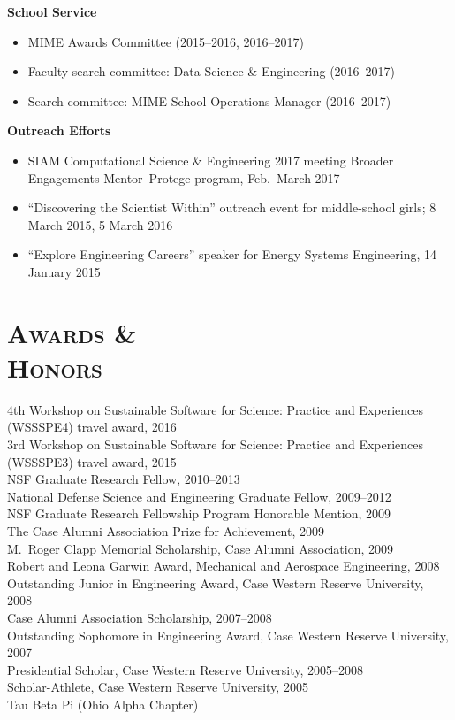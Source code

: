 \documentclass[margin,line,11pt]{res}
\begin{document}
\begin{resume}
\textbf{School Service}
\begin{itemize}[leftmargin=*]
    \item MIME Awards Committee (2015--2016, 2016--2017)
    \item Faculty search committee: Data Science \& Engineering (2016--2017)
    \item Search committee: MIME School Operations Manager (2016--2017)
\end{itemize}

\textbf{Outreach Efforts}
\begin{itemize}[leftmargin=*]
    \item SIAM Computational Science \& Engineering 2017 meeting Broader Engagements Mentor--Protege program, Feb.--March 2017
    \item ``Discovering the Scientist Within'' outreach event for middle-school girls; 8 March 2015, 5 March 2016
    \item ``Explore Engineering Careers'' speaker for Energy Systems Engineering, 14 January 2015
\end{itemize}

\section{\textsc{Awards \& \\Honors}}
4th Workshop on Sustainable Software for Science: Practice and Experiences (WSSSPE4) travel award, 2016 \\
3rd Workshop on Sustainable Software for Science: Practice and Experiences (WSSSPE3) travel award, 2015 \\
NSF Graduate Research Fellow, 2010--2013 \\
National Defense Science and Engineering Graduate Fellow, 2009--2012 \\
NSF Graduate Research Fellowship Program Honorable Mention, 2009 \\
The Case Alumni Association Prize for Achievement, 2009 \\
M.\ Roger Clapp Memorial Scholarship, Case Alumni Association, 2009 \\
Robert and Leona Garwin Award, Mechanical and Aerospace Engineering, 2008 \\
Outstanding Junior in Engineering Award, Case Western Reserve University, 2008 \\
Case Alumni Association Scholarship, 2007--2008 \\
Outstanding Sophomore in Engineering Award, Case Western Reserve University, 2007 \\
Presidential Scholar, Case Western Reserve University, 2005--2008 \\
Scholar-Athlete, Case Western Reserve University, 2005 \\
Tau Beta Pi (Ohio Alpha Chapter)


\end{resume}
\end{document}
